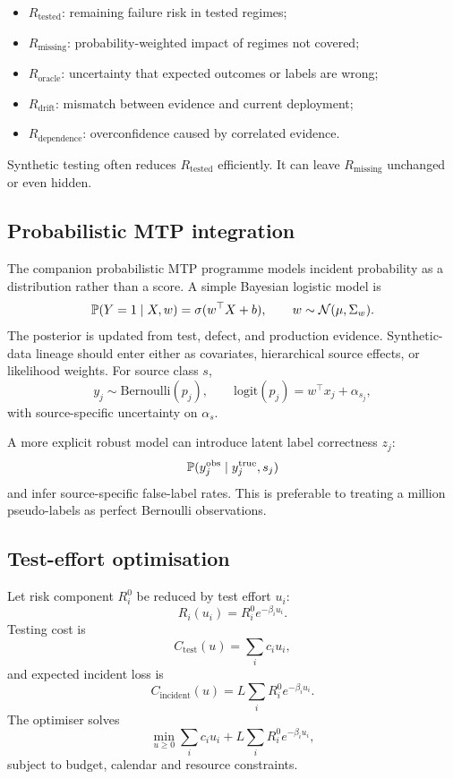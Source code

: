 \begin{itemize}[leftmargin=*]
  \item $R_{\mathrm{tested}}$: remaining failure risk in tested regimes;
  \item $R_{\mathrm{missing}}$: probability-weighted impact of regimes not covered;
  \item $R_{\mathrm{oracle}}$: uncertainty that expected outcomes or labels are wrong;
  \item $R_{\mathrm{drift}}$: mismatch between evidence and current deployment;
  \item $R_{\mathrm{dependence}}$: overconfidence caused by correlated evidence.
\end{itemize}

Synthetic testing often reduces $R_{\mathrm{tested}}$ efficiently. It can leave $R_{\mathrm{missing}}$ unchanged or even hidden.

\subsection{Probabilistic MTP integration}

The companion probabilistic MTP programme models incident probability as a distribution rather than a score. A simple Bayesian logistic model is
\[
\mathbb{P}(Y=1\mid X,w)
=\sigma(w^\top X+b),
\qquad
w\sim\mathcal N(\mu,\Sigma_w).
\]
The posterior is updated from test, defect, and production evidence. Synthetic-data lineage should enter either as covariates, hierarchical source effects, or likelihood weights. For source class $s$,
\[
y_j\sim\mathrm{Bernoulli}(p_j),
\qquad
\mathrm{logit}(p_j)=w^\top x_j + \alpha_{s_j},
\]
with source-specific uncertainty on $\alpha_s$.

A more explicit robust model can introduce latent label correctness $z_j$:
\[
\mathbb{P}(y_j^{\mathrm{obs}}\mid y_j^{\mathrm{true}},s_j)
\]
and infer source-specific false-label rates. This is preferable to treating a million pseudo-labels as perfect Bernoulli observations.

\subsection{Test-effort optimisation}

Let risk component $R_i^0$ be reduced by test effort $u_i$:
\[
R_i(u_i)=R_i^0e^{-\beta_i u_i}.
\]
Testing cost is
\[
C_{\mathrm{test}}(u)=\sum_i c_i u_i,
\]
and expected incident loss is
\[
C_{\mathrm{incident}}(u)
=L\sum_iR_i^0e^{-\beta_i u_i}.
\]
The optimiser solves
\[
\min_{u\ge0}
\sum_i c_i u_i
+L\sum_iR_i^0e^{-\beta_i u_i},
\]
subject to budget, calendar and resource constraints.


